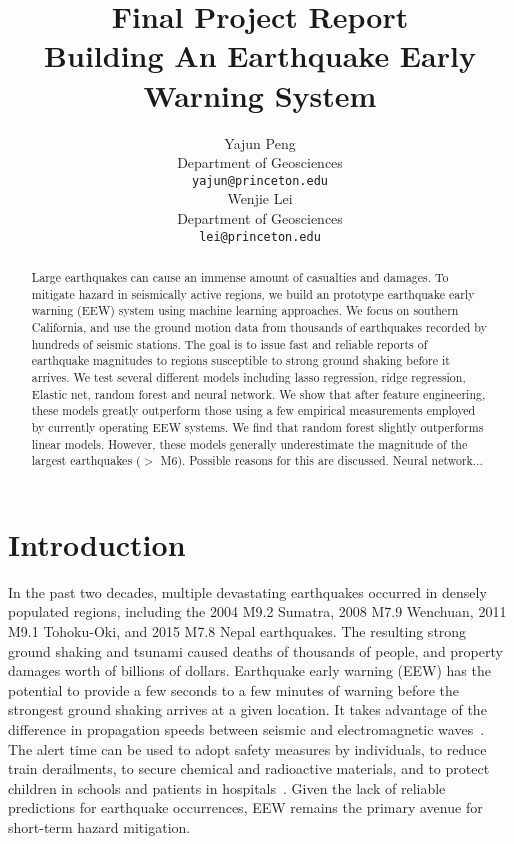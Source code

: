 \documentclass{article} %
\title{Final Project Report \\Building An Earthquake Early Warning System}
\author{
Yajun Peng\\
Department of Geosciences\\
\texttt{yajun@princeton.edu} \\
\And
Wenjie Lei \\
Department of Geosciences \\
\texttt{lei@princeton.edu} \\
}
\begin{document}
\maketitle

\begin{abstract}
Large earthquakes can cause an immense amount of casualties and damages. To mitigate hazard in seismically active regions, we build an prototype earthquake early warning (EEW) system using machine learning approaches. We focus on southern California, and use the ground motion data from thousands of earthquakes recorded by hundreds of seismic stations. The goal is to issue fast and reliable reports of earthquake magnitudes to regions susceptible to strong ground shaking before it arrives. We test several different models including lasso regression, ridge regression, Elastic net, random forest and neural network. We show that after feature engineering, these models greatly outperform those using a few empirical measurements employed by currently operating EEW systems. We find that random forest slightly outperforms linear models. However, these models generally underestimate the magnitude of the largest earthquakes ($>$ M6). Possible reasons for this are discussed. Neural network...       

\end{abstract}

\section{Introduction}
In the past two decades, multiple devastating earthquakes occurred in densely populated regions, including the 2004 M9.2 Sumatra, 2008 M7.9 Wenchuan, 2011 M9.1 Tohoku-Oki, and 2015 M7.8 Nepal earthquakes. The resulting strong ground shaking and tsunami caused deaths of thousands of people, and property damages worth of billions of dollars. Earthquake early warning (EEW) has the potential to provide a few seconds to
a few minutes of warning before the strongest ground shaking arrives at a given
location. It takes advantage of the difference in propagation speeds between seismic and
electromagnetic waves~\cite{Allen2009, Bose2009}. The alert time can be used to adopt safety measures by individuals, to reduce train derailments, to secure chemical and radioactive materials, and to protect children in schools and patients in hospitals~\cite{Strauss2016}. Given the lack of reliable predictions for earthquake occurrences, EEW remains the primary avenue for short-term hazard mitigation. 
\end{document}
